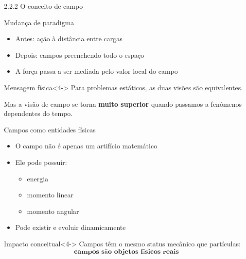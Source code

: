 \documentclass[aspectratio=169]{beamer}
\begin{document}
\begin{frame}{2.2.2 O conceito de campo}

\begin{block}{Mudança de paradigma}
\begin{itemize}
\item<1-> Antes: ação à distância entre cargas
\item<2-> Depois: campos preenchendo todo o espaço
\item<3-> A força passa a ser mediada pelo valor local do campo
\end{itemize}
\end{block}

\begin{alertblock}{Mensagem física}<4->
Para problemas estáticos, as duas visões são equivalentes.

\vspace{0.1cm}
Mas a visão de campo se torna \textbf{muito superior} quando passamos a fenômenos dependentes do tempo.
\end{alertblock}

\end{frame}

\begin{frame}{Campos como entidades físicas}

\begin{itemize}
\item<1-> O campo não é apenas um artifício matemático
\item<2-> Ele pode possuir:
\begin{itemize}
\item<2-> energia
\item<2-> momento linear
\item<2-> momento angular
\end{itemize}
\item<3-> Pode existir e evoluir dinamicamente
\end{itemize}

\begin{alertblock}{Impacto conceitual}<4->
Campos têm o mesmo status mecânico que partículas:
\[
\textbf{campos são objetos físicos reais}
\]
\end{alertblock}

\end{frame}
\end{document}
